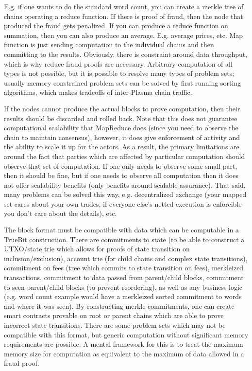 \documentclass[letterpaper, 11pt]{article}
\begin{document}
E.g. if one wants to do the standard word count, you can create a merkle tree of
chains operating a reduce function. If there is proof of fraud, then the node
that produced the fraud gets penalized. If you can produce a reduce function on
summation, then you can also produce an average. E.g. average prices, etc. Map
function is just sending computation to the individual chains and then
committing to the results. Obviously, there is constraint around data
throughput, which is why reduce fraud proofs are necessary. Arbitrary
computation of all types is not possible, but it is possible to resolve many
types of problem sets; usually memory constrained problem sets can be solved by
first running sorting algorithms, which makes tradeoffs of inter-Plasma chain
traffic.

If the nodes cannot produce the actual blocks to prove computation, then their
results should be discarded and rolled back. Note that this does not guarantee
computational scalability that MapReduce does (since you need to observe the
chain to maintain consensus), however, it does give enforcement of activity and
the ability to scale it up for the actors. As a result, the primary limitations
are around the fact that parties which are affected by particular computation
should observe that set of computation. If one only needs to observe some small
part, then it should be fine, but if one needs to observe all computation then
it does not offer scalability benefits (only benefits around scalable
assurance). That said, many problems can be solved this way, e.g. decentralized
exchange (your mapped set cares about your own trades, if everyone else's netted
execution is enforcible you don't care about the details), etc.

The block format must be compatible with data which can be computable in a
TrueBit construction. There are commitments to state (to be able to construct a
UTXO/state trie which allows for proofs of state transition on
inclusion/exclusion), account trie (for child chains and complex state
transitions), commitment on fees (tree which commits to state transition on
fees), merkleized transactions, commitment to data passed from parent/child
blocks, commitment to seen parent/child blocks (to prevent reordering), as well
as any business logic (e.g. word count example would have a merkleized sorted
commitment to words and where it was seen). By constructing merkle commitments,
one can create smart contracts provable on root or parent chains which are able
to prove incorrect state transitions. There are some problem sets which may not
be compatible with this format, but generic computation without significant
memory requirements are possible. A mental framework for this is to treat the
maximum memory size for computation as equivalent to the maximum of data allowed
in a fraud proof.
\end{document}
